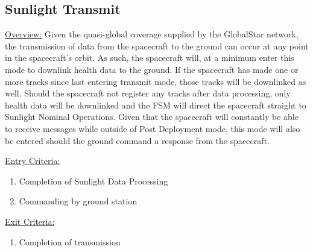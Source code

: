 \documentclass{article}
\begin{document}
\newpage

\subsection{Sunlight Transmit}

\underline{Overview:} Given the quasi-global coverage supplied by the GlobalStar network, the transmission of data from the spacecraft to the ground can occur at any point in the spacecraft's orbit. As such, the spacecraft will, at a minimum enter this mode to downlink health data to the ground. If the spacecraft has made one or more tracks since last entering transmit mode, those tracks will be downlinked as well. Should the spacecraft not register any tracks after data processing, only health data will be downlinked and the FSM will direct the spacecraft straight to Sunlight Nominal Operations. Given that the spacecraft will constantly be able to receive messages while outside of Post Deployment mode, this mode will also be entered should the ground command a response from the spacecraft.

\underline{Entry Criteria:} 

\begin{enumerate}
\item Completion of Sunlight Data Processing
\item Commanding by ground station
\end{enumerate}

\underline{Exit Criteria:}

\begin{enumerate}
\item Completion of transmission
\end{enumerate}
\end{document}
